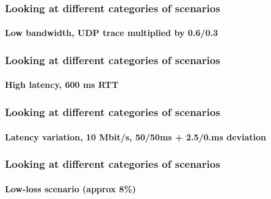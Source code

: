 \begin{frame}

    \frametitle{Looking at different categories of scenarios}
    \framesubtitle{Low bandwidth, UDP trace multiplied by 0.6/0.3}

    \begin{overprint}
        \uncover<+->{}
    \end{overprint}

\end{frame}


\begin{frame}

    \frametitle{Looking at different categories of scenarios}
    \framesubtitle{High latency, 600 ms RTT}

    \begin{overprint}
        \uncover<+->{}
    \end{overprint}

\end{frame}

\begin{frame}

    \frametitle{Looking at different categories of scenarios}
    \framesubtitle{Latency variation, 10 Mbit/s, 50/50ms + 2.5/0.ms deviation}

    \begin{overprint}
        \uncover<+->{}
    \end{overprint}

\end{frame}


\begin{frame}

    \frametitle{Looking at different categories of scenarios}
    \framesubtitle{Low-loss scenario (approx 8\%)}

    \begin{overprint}
        \uncover<+->{}
    \end{overprint}

\end{frame}

